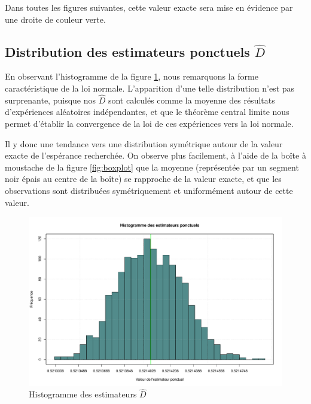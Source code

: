 \documentclass[paper=a4, fontsize=11pt]{scrartcl}
\begin{document}
Dans toutes les figures suivantes, cette valeur exacte sera mise en évidence par une droite de couleur verte.

\subsection{Distribution des estimateurs ponctuels $\widehat{D}$}

En observant l'histogramme de la figure \ref{fig:hist}, nous remarquons la forme caractéristique de la loi normale. L'apparition d'une telle distribution n'est pas surprenante, puisque nos $\widehat{D}$ sont calculés comme la moyenne des résultats d'expériences aléatoires indépendantes, et que le théorème central limite nous permet d'établir la convergence de la loi de ces expériences vers la loi normale.

Il y donc une tendance vers une distribution symétrique autour de la valeur exacte de l'espérance recherchée. On observe plus facilement, à l'aide de la boîte à moustache de la figure \ref{fig:boxplot} que la moyenne (représentée par un segment noir épais au centre de la boîte) se rapproche de la valeur exacte, et que les observations sont distribuées symétriquement et uniformément autour de cette valeur.

\begin{figure}[H]
  \centering
  \includegraphics[scale=0.5]{../analysis/plots/EstimatorHistogram.pdf}
  \caption{Histogramme des estimateurs $\widehat{D}$}
  \label{fig:hist}
\end{figure}
\end{document}
